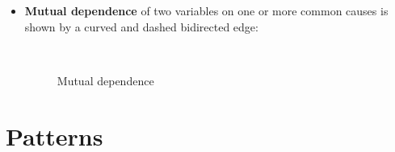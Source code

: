 \begin{itemize}
\item \textbf{Mutual dependence} of two variables on one or more common causes is shown by a curved and dashed bidirected edge:

\begin{figure}[htp]\centering
\caption{Mutual dependence}\
\end{figure}

\end{itemize}

\section*{Patterns}

